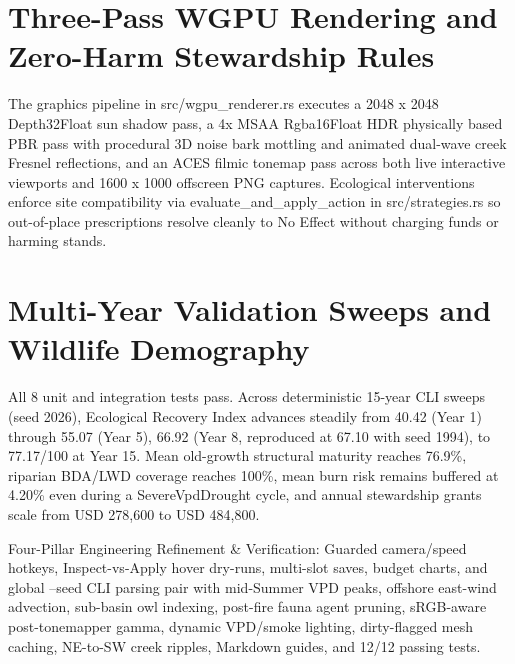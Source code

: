 \documentclass[10pt,letterpaper]{article}
\begin{document}
\section{Three-Pass WGPU Rendering and Zero-Harm Stewardship Rules}
The graphics pipeline in src/wgpu\_renderer.rs executes a 2048 x 2048 Depth32Float sun shadow pass, a 4x MSAA Rgba16Float HDR physically based PBR pass with procedural 3D noise bark mottling and animated dual-wave creek Fresnel reflections, and an ACES filmic tonemap pass across both live interactive viewports and 1600 x 1000 offscreen PNG captures. Ecological interventions enforce site compatibility via evaluate\_and\_apply\_action in src/strategies.rs so out-of-place prescriptions resolve cleanly to No Effect without charging funds or harming stands.

\section{Multi-Year Validation Sweeps and Wildlife Demography}
All 8 unit and integration tests pass. Across deterministic 15-year CLI sweeps (seed 2026), Ecological Recovery Index advances steadily from 40.42 (Year 1) through 55.07 (Year 5), 66.92 (Year 8, reproduced at 67.10 with seed 1994), to 77.17/100 at Year 15. Mean old-growth structural maturity reaches 76.9\%, riparian BDA/LWD coverage reaches 100\%, mean burn risk remains buffered at 4.20\% even during a SevereVpdDrought cycle, and annual stewardship grants scale from USD 278,600 to USD 484,800.

Four-Pillar Engineering Refinement \& Verification: Guarded camera/speed hotkeys, Inspect-vs-Apply hover dry-runs, multi-slot saves, budget charts, and global --seed CLI parsing pair with mid-Summer VPD peaks, offshore east-wind advection, sub-basin owl indexing, post-fire fauna agent pruning, sRGB-aware post-tonemapper gamma, dynamic VPD/smoke lighting, dirty-flagged mesh caching, NE-to-SW creek ripples, Markdown guides, and 12/12 passing tests.
\end{document}
